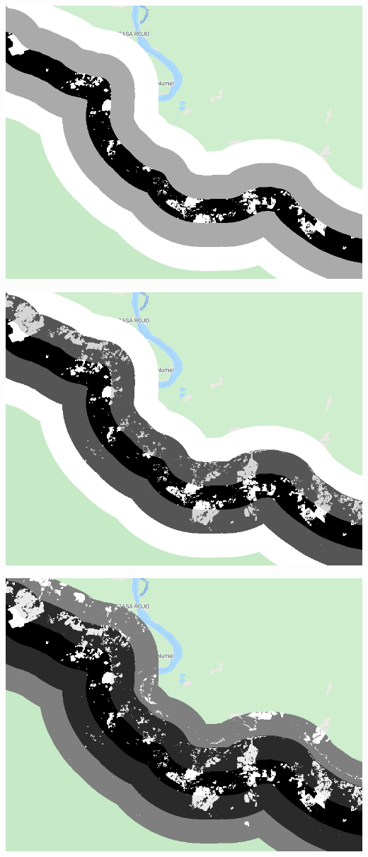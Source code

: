 \documentclass[
  letterpaper,
  DIV=11,
  numbers=noendperiod]{scrreprt}
\begin{document}
\includegraphics{./F5/image6.png}

\includegraphics{./F5/image21.png}

\includegraphics{./F5/image26.png}
\end{document}
